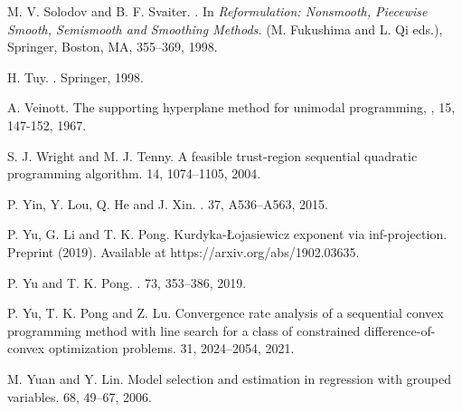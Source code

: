 \documentclass[10pt]{article}
\numberwithin{equation}{section}
\begin{document}
\begin{thebibliography}{99}
M. V. Solodov and B. F. Svaiter.
.
\newblock In {\em Reformulation: Nonsmooth, Piecewise Smooth, Semismooth and Smoothing Methods.} (M. Fukushima and L. Qi eds.), Springer, Boston, MA, 355--369, 1998.

H. Tuy.
.
\newblock Springer, 1998.


{\color{black} A. Veinott.
\newblock The supporting hyperplane method for unimodal programming,
, 15, 147-152, 1967.}

S. J. Wright and M. J. Tenny.
\newblock A feasible trust-region sequential quadratic programming algorithm.
 14, 1074--1105, 2004.

P. Yin, Y. Lou, Q. He and J. Xin.
.
 37, A536--A563, 2015.

P. Yu, G. Li and T. K. Pong.
\newblock Kurdyka-{\L}ojasiewicz exponent via inf-projection.
\newblock Preprint (2019). Available at https://arxiv.org/abs/1902.03635.

P. Yu and T. K. Pong.
.
 73, 353--386, 2019.

{\color{black}
P. Yu,  T. K. Pong and Z. Lu.
\newblock Convergence rate analysis of a sequential convex programming method with line search for a class of constrained difference-of-convex optimization problems.
 31, 2024--2054, 2021.}

M. Yuan and Y. Lin.
\newblock Model selection and estimation in regression with grouped variables.
 68, 49--67, 2006.



\end{thebibliography}
\end{document}
